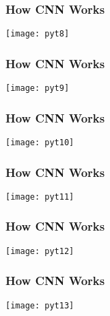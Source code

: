 \begin{frame}[fragile] \frametitle{How CNN Works}
\begin{center}
\texttt{[image: pyt8]}
\end{center}

\end{frame}

\begin{frame}[fragile] \frametitle{How CNN Works}
\begin{center}
\texttt{[image: pyt9]}
\end{center}

\end{frame}

\begin{frame}[fragile] \frametitle{How CNN Works}
\begin{center}
\texttt{[image: pyt10]}
\end{center}

\end{frame}

\begin{frame}[fragile] \frametitle{How CNN Works}
\begin{center}
\texttt{[image: pyt11]}
\end{center}

\end{frame}

\begin{frame}[fragile] \frametitle{How CNN Works}
\begin{center}
\texttt{[image: pyt12]}
\end{center}

\end{frame}

\begin{frame}[fragile] \frametitle{How CNN Works}
\begin{center}
\texttt{[image: pyt13]}
\end{center}

\end{frame}

